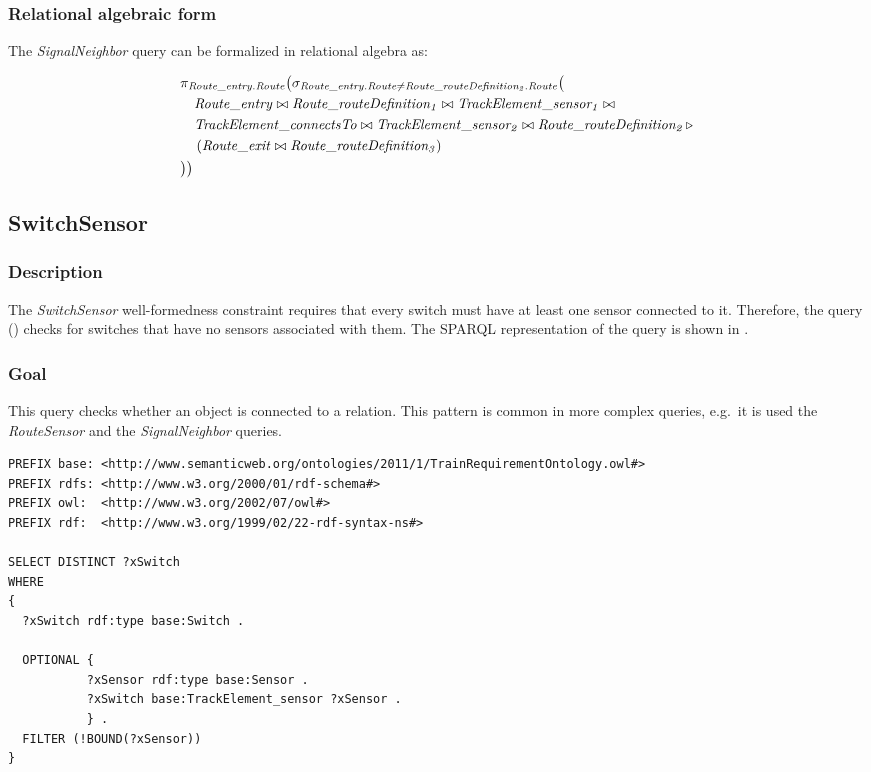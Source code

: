 
\subsubsection{Relational algebraic form} The \textit{SignalNeighbor} query can be formalized in relational algebra as:

\begin{align*}
& \pi_{\mathit{Route\_entry.Route}} \big( \sigma_{\mathit{Route\_entry.Route} \neq \mathit{Route\_routeDefinition_2.Route}} \big( \\
& \quad \mathit{Route\_entry} \bowtie \mathit{Route\_routeDefinition_1} \bowtie \mathit{TrackElement\_sensor_1} \bowtie \\
& \quad \mathit{TrackElement\_connectsTo} \bowtie \mathit{TrackElement\_sensor_2} \bowtie \mathit{Route\_routeDefinition_2} \, \triangleright \, \\
& \quad \left( \mathit{Route\_exit} \bowtie \mathit{Route\_routeDefinition_3} \right) \\
& \big) \big)
\end{align*}

\subsection{SwitchSensor}

\subsubsection{Description} The \textit{SwitchSensor} well-formedness constraint requires that every switch must have at least one sensor connected to it. Therefore, the query () checks for switches that have no sensors associated with them. The SPARQL representation of the query is shown in .

\subsubsection{Goal} This query checks whether an object is connected to a relation. This pattern is common in more complex queries, e.g.\ it is used the \textit{RouteSensor} and the \textit{SignalNeighbor} queries.

\begin{lstlisting}[caption=The RouteSensor query in SPARQL, label=lst:switchsensor-sparql]
PREFIX base: <http://www.semanticweb.org/ontologies/2011/1/TrainRequirementOntology.owl#>
PREFIX rdfs: <http://www.w3.org/2000/01/rdf-schema#>
PREFIX owl:  <http://www.w3.org/2002/07/owl#>
PREFIX rdf:  <http://www.w3.org/1999/02/22-rdf-syntax-ns#>

SELECT DISTINCT ?xSwitch
WHERE
{
  ?xSwitch rdf:type base:Switch .

  OPTIONAL { 
           ?xSensor rdf:type base:Sensor .
           ?xSwitch base:TrackElement_sensor ?xSensor .
           } .
  FILTER (!BOUND(?xSensor))
}
\end{lstlisting}

